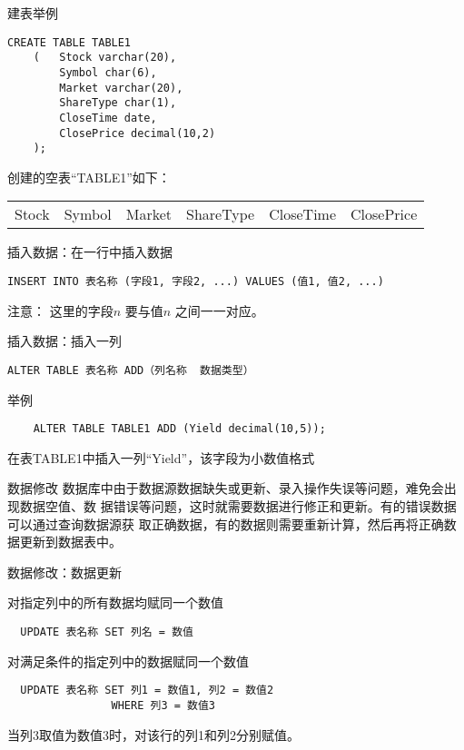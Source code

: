 \documentclass[t]{beamer}
\begin{document}
\begin{frame}[fragile]{建表举例}
\begin{lstlisting}
CREATE TABLE TABLE1
    (   Stock varchar(20),
        Symbol char(6),
        Market varchar(20),
        ShareType char(1),
        CloseTime date,
        ClosePrice decimal(10,2)
    );
\end{lstlisting}
创建的空表“TABLE1”如下：
\begin{center}
\begin{tabular}{cccccc}
  Stock& Symbol& Market &ShareType &CloseTime &ClosePrice
\end{tabular}
\end{center}
\end{frame}

\begin{frame}[fragile]{插入数据：在一行中插入数据}
  
\begin{lstlisting}
INSERT INTO 表名称 (字段1, 字段2, ...) VALUES (值1, 值2, ...)
\end{lstlisting}
\begin{block}{注意：}
  这里的{\color{blue}字段$n$} 要与{\color{red}值$n$} 之间一一对应。
\end{block}
\end{frame}


\begin{frame}[fragile]{插入数据：插入一列}
\begin{lstlisting}
ALTER TABLE 表名称 ADD（列名称  数据类型）
\end{lstlisting}

\begin{block}{举例}
\begin{lstlisting}
    ALTER TABLE TABLE1 ADD (Yield decimal(10,5));
\end{lstlisting}
\end{block}
在表TABLE1中插入一列“Yield”，该字段为小数值格式
\end{frame}

\begin{frame}[fragile]{数据修改}
  数据库中由于数据源数据缺失或更新、录入操作失误等问题，难免会出现数据空值、数
据错误等问题，这时就需要数据进行修正和更新。有的错误数据可以通过查询数据源获
取正确数据，有的数据则需要重新计算，然后再将正确数据更新到数据表中。
\end{frame}

\begin{frame}[fragile]{数据修改：数据更新}
\begin{block}{对指定列中的所有数据均赋同一个数值}
  \begin{lstlisting}
  UPDATE 表名称 SET 列名 = 数值
\end{lstlisting}
\end{block}

\begin{block}{对{\color{red}满足条件}的指定列中的数据赋同一个数值}
  \begin{lstlisting}
  UPDATE 表名称 SET 列1 = 数值1, 列2 = 数值2 
                WHERE 列3 = 数值3 
\end{lstlisting}
当列3取值为数值3时，对该行的列1和列2分别赋值。
\end{block}
\end{frame}
\end{document}
